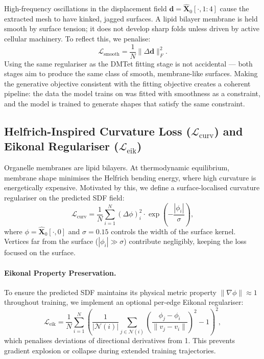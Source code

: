 \documentclass[10pt, a4paper, twocolumn]{article}
\begin{document}
High-frequency oscillations in the displacement field $\mathbf{d} = \hat{\mathbf{X}}_0[\cdot, 1:4]$ cause the extracted mesh to have kinked, jagged surfaces. A lipid bilayer membrane is held smooth by surface tension; it does not develop sharp folds unless driven by active cellular machinery. To reflect this, we penalise:
\begin{equation}
    \mathcal{L}_{\text{smooth}} = \frac{1}{N} \| \Delta \mathbf{d} \|_F^2.
\end{equation}
Using the same regulariser as the DMTet fitting stage is not accidental — both stages aim to produce the same class of smooth, membrane-like surfaces. Making the generative objective consistent with the fitting objective creates a coherent pipeline: the data the model trains on was fitted with smoothness as a constraint, and the model is trained to generate shapes that satisfy the same constraint.

\subsection{Helfrich-Inspired Curvature Loss ($\mathcal{L}_{\text{curv}}$) and Eikonal Regulariser ($\mathcal{L}_{\text{eik}}$)}
\label{sec:curv_loss}

Organelle membranes are lipid bilayers. At thermodynamic equilibrium, membrane shape minimises the Helfrich bending energy, where high curvature is energetically expensive. Motivated by this, we define a surface-localised curvature regulariser on the predicted SDF field:
\begin{equation}
    \mathcal{L}_{\text{curv}} = \frac{1}{N} \sum_{i=1}^{N} (\Delta \phi)_i^2 \cdot \exp\!\left(-\frac{|\phi_i|}{\sigma}\right),
\end{equation}
where $\phi = \hat{\mathbf{X}}_0[\cdot, 0]$ and $\sigma = 0.15$ controls the width of the surface kernel. Vertices far from the surface ($|\phi_i| \gg \sigma$) contribute negligibly, keeping the loss focused on the surface.

\paragraph{Eikonal Property Preservation.}
To ensure the predicted SDF maintains its physical metric property $\|\nabla\phi\| \approx 1$ throughout training, we implement an optional per-edge Eikonal regulariser:
\begin{equation}
    \mathcal{L}_{\text{eik}} = \frac{1}{N} \sum_{i=1}^{N} \left(\frac{1}{|\mathcal{N}(i)|} \sum_{j \in \mathcal{N}(i)} \left(\frac{\phi_j - \phi_i}{\|v_j - v_i\|}\right)^{\!2} - 1\right)^{\!2},
\end{equation}
which penalises deviations of directional derivatives from 1. This prevents gradient explosion or collapse during extended training trajectories.
\end{document}
